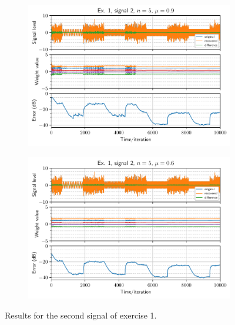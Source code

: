 \begin{figure}
\begin{subfigure}[t]{0.30\columnwidth}
        \caption{}
    \end{subfigure} \\
    \begin{subfigure}[t]{0.30\columnwidth}
        \centering
        \includegraphics[width=\columnwidth]{figures/pdf/ex1_l2_n5_mu90.pdf}
        \caption{}
    \end{subfigure} %
    \begin{subfigure}[t]{0.30\columnwidth}
        \centering
        \includegraphics[width=\columnwidth]{figures/pdf/ex1_l2_n5_mu60.pdf}
        \caption{}
    \end{subfigure}
    \caption{Results for the second signal of exercise 1.\label{fig:ex1sig2}}
\end{figure}

